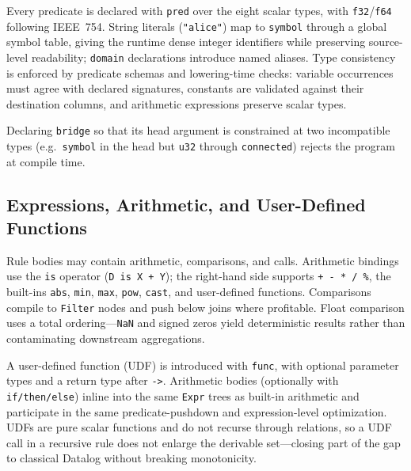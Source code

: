 Every predicate is declared with \texttt{pred} over the eight scalar types, with \texttt{f32}/\texttt{f64} following IEEE~754. String literals (\texttt{"alice"}) map to \texttt{symbol} through a global symbol table, giving the runtime dense integer identifiers while preserving source-level readability; \texttt{domain} declarations introduce named aliases. Type consistency is enforced by predicate schemas and lowering-time checks: variable occurrences must agree with declared signatures, constants are validated against their destination columns, and arithmetic expressions preserve scalar types.



Declaring \texttt{bridge} so that its head argument is constrained at two incompatible types (e.g.\ \texttt{symbol} in the head but \texttt{u32} through \texttt{connected}) rejects the program at compile time.

\subsection{Expressions, Arithmetic, and User-Defined Functions}\label{sec:lang:arith}

Rule bodies may contain arithmetic, comparisons, and calls. Arithmetic bindings use the \texttt{is} operator (\texttt{D is X + Y}); the right-hand side supports \texttt{+ - * / \%}, the built-ins \texttt{abs}, \texttt{min}, \texttt{max}, \texttt{pow}, \texttt{cast}, and user-defined functions. Comparisons compile to \texttt{Filter} nodes and push below joins where profitable. Float comparison uses a total ordering---\texttt{NaN} and signed zeros yield deterministic results rather than contaminating downstream aggregations.



A user-defined function (UDF) is introduced with \texttt{func}, with optional parameter types and a return type after \texttt{->}. Arithmetic bodies (optionally with \texttt{if/then/else}) inline into the same \texttt{Expr} trees as built-in arithmetic and participate in the same predicate-pushdown and expression-level optimization. UDFs are pure scalar functions and do not recurse through relations, so a UDF call in a recursive rule does not enlarge the derivable set---closing part of the gap to classical Datalog without breaking monotonicity.

